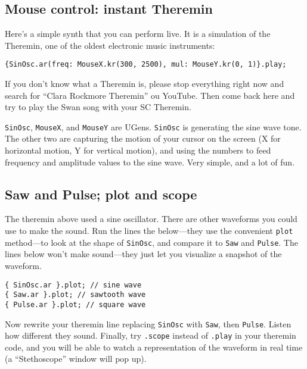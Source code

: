 \subsection{Mouse control: instant Theremin}

Here's a simple synth that you can perform live. It is a simulation of the Theremin, one of the oldest electronic music instruments:

\begin{lstlisting}[style=SuperCollider-IDE, basicstyle=\scttfamily\footnotesize]
{SinOsc.ar(freq: MouseX.kr(300, 2500), mul: MouseY.kr(0, 1)}.play;
\end{lstlisting}

If you don't know what a Theremin is, please stop everything right now and search for ``Clara Rockmore Theremin'' ou YouTube. Then come back here and try to play the Swan song with your SC Theremin.

\texttt{SinOsc}, \texttt{MouseX}, and \texttt{MouseY} are UGens. \texttt{SinOsc} is generating the sine wave tone. The other two are capturing the motion of your cursor on the screen (X for horizontal motion, Y for vertical motion), and using the numbers to feed frequency and amplitude values to the sine wave. Very simple, and a lot of fun.

\subsection{Saw and Pulse; plot and scope}

The theremin above used a sine oscillator. There are other waveforms you could use to make the sound. Run the lines the below---they use the convenient \texttt{plot} method---to look at the shape of \texttt{SinOsc}, and compare it to \texttt{Saw} and \texttt{Pulse}. The lines below won't make sound---they just let you visualize a snapshot of the waveform. 

\begin{lstlisting}[style=SuperCollider-IDE, basicstyle=\scttfamily\footnotesize]
{ SinOsc.ar }.plot; // sine wave
{ Saw.ar }.plot; // sawtooth wave
{ Pulse.ar }.plot; // square wave
\end{lstlisting}

Now rewrite your theremin line replacing \texttt{SinOsc} with \texttt{Saw}, then \texttt{Pulse}. Listen how different they sound. Finally, try \texttt{.scope} instead of \texttt{.play} in your theremin code, and you will be able to watch a representation of the waveform in real time (a ``Stethoscope'' window will pop up).